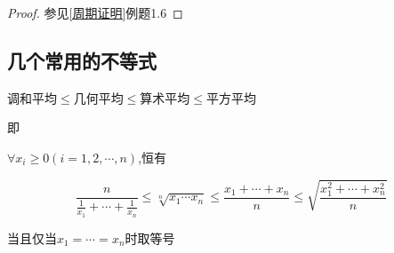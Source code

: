 \begin{proof}

    参见\ref{周期证明}例题1.6
\end{proof}

\subsection{几个常用的不等式}

\begin{theorem}[均值不等式]
    调和平均$\le$几何平均$\le$算术平均$\le$平方平均

    即

    $\forall x_i\ge 0(i=1,2,\cdots,n)$,恒有

    \begin{equation}    \label{均值不等式}
        \frac{n}{\frac{1}{x_1}+\cdots+\frac{1}{x_n}}\le \sqrt[n]{x_1\cdots x_n}\le  \frac{x_1+\cdots+x_n}{n} \le \sqrt{\frac{x_1^2+\cdots+x_n^2}{n}}
    \end{equation}

    当且仅当$x_1=\cdots=x_n$时取等号
\end{theorem}

